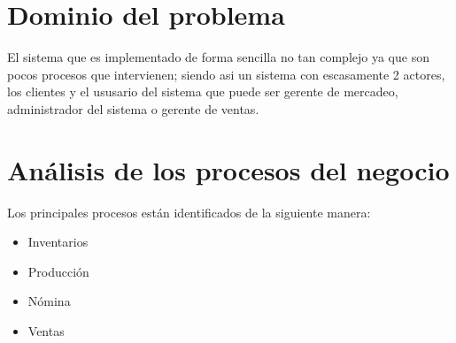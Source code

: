 \section{Dominio del problema}
El sistema que es implementado de forma sencilla no tan complejo ya que son pocos procesos que intervienen; siendo asi un sistema con escasamente 2 actores, los clientes y el ususario del sistema que puede ser gerente de mercadeo, administrador del sistema o gerente de ventas.%
%
\section{An\'alisis de los procesos del negocio}
Los principales procesos est\'an identificados de la siguiente manera:%
	\begin{itemize}
		\item Inventarios
		\item Producci\'on
		\item N\'omina
		\item Ventas
	\end{itemize}
